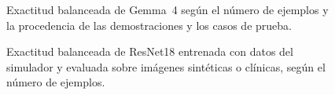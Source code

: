 \begin{figure}[H]
  \centering
  \caption{Exactitud balanceada de Gemma~4 según el número de ejemplos y la procedencia de las demostraciones y los casos de prueba.}
  \label{fig:domain_gap_icl}
\end{figure}

\begin{figure}[H]
  \centering
  \caption{Exactitud balanceada de ResNet18 entrenada con datos del simulador y evaluada sobre imágenes sintéticas o clínicas, según el número de ejemplos.}
  \label{fig:domain_gap_cnn}
\end{figure}
